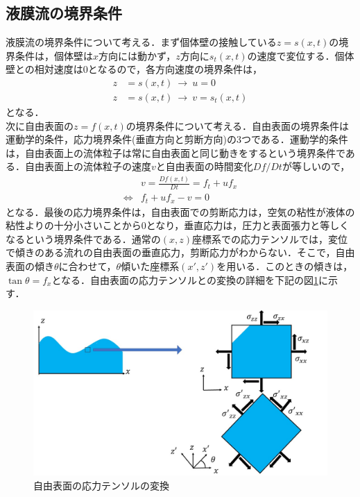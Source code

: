 \documentclass[autodetect-engine,dvipdfmx-if-dvi,ja=standard,a4paper,11pt]{bxjsarticle} %
\begin{document}
\subsection{液膜流の境界条件}
液膜流の境界条件について考える．まず個体壁の接触している$z=s(x,t)$の境界条件は，個体壁は$x$方向には動かず，$z$方向に$s_t(x,t)$の速度で変位する．個体壁との相対速度は0となるので，各方向速度の境界条件は，
\begin{subequations}
\begin{align}
z&=s(x,t)\ \rightarrow\ u=0\label{eq:sbc1}\\
z&=s(x,t)\ \rightarrow\ v=s_t(x,t)\label{eq:sbc2}
\end{align}
\label{eq:sbc}
\end{subequations}
となる．\\
\　次に自由表面の$z=f(x,t)$の境界条件について考える．自由表面の境界条件は運動学的条件，応力境界条件(垂直方向と剪断方向)の3つである．運動学的条件は，自由表面上の流体粒子は常に自由表面と同じ動きをするという境界条件である．自由表面上の流体粒子の速度$v$と自由表面の時間変化$Df/Dt$が等しいので，
\begin{equation*}
\begin{split}
&v=\frac{Df(x,t)}{Dt}=f_t+uf_x\\
\Leftrightarrow&f_t+uf_x-v=0
\end{split}
\end{equation*}
となる．最後の応力境界条件は，自由表面での剪断応力は，空気の粘性が液体の粘性よりの十分小さいことから0となり，垂直応力は，圧力と表面張力と等しくなるという境界条件である．通常の$(x,z)$座標系での応力テンソルでは，変位で傾きのある流れの自由表面の垂直応力，剪断応力がわからない．そこで，自由表面の傾き$\theta$に合わせて，$\theta$傾いた座標系$(x',z')$を用いる．このときの傾きは，$\tan\theta=f_x$となる．自由表面の応力テンソルとの変換の詳細を下記の図\ref{fig:sigma}に示す．
\begin{figure}[H]%
\begin{center}
\includegraphics[width=.6\textwidth]{sigma.jpg} 
\end{center}
\caption{自由表面の応力テンソルの変換}%
\label{fig:sigma}%
\end{figure}
\end{document}
